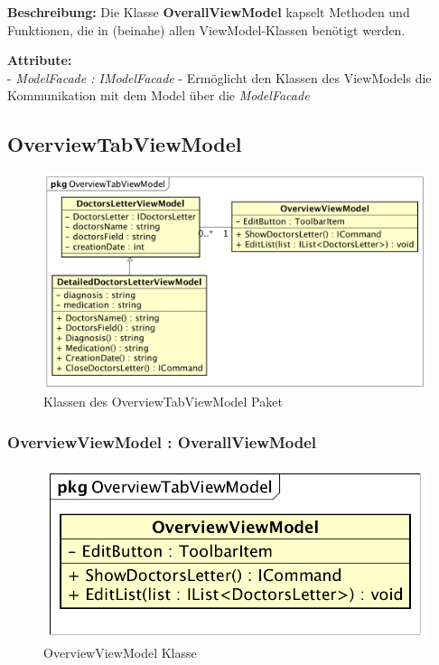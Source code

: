 \documentclass[a4paper]{scrreprt}
\begin{document}
\textbf{Beschreibung:} Die Klasse \textbf{OverallViewModel} kapselt Methoden und Funktionen, die in (beinahe) allen ViewModel-Klassen benötigt werden.

\textbf{Attribute:}\\
- \textit{ModelFacade : IModelFacade} - Ermöglicht den Klassen des ViewModels die Kommunikation mit dem Model über die \textit{ModelFacade}\\

\subsection{OverviewTabViewModel}
\begin{figure}[H]
\centering
\includegraphics[width=0.75\textheight]{graphics/Klassendiagramme/ViewModel/OverviewTabViewModel.png}
\caption{Klassen des OverviewTabViewModel Paket}
\end{figure}

\subsubsection{OverviewViewModel : OverallViewModel}
\begin{figure}[H]
\centering
\includegraphics[width=0.45\textheight]{graphics/Klassendiagramme/ViewModel/OverviewViewModel.png}
\caption{OverviewViewModel Klasse}
\end{figure}
\end{document}
